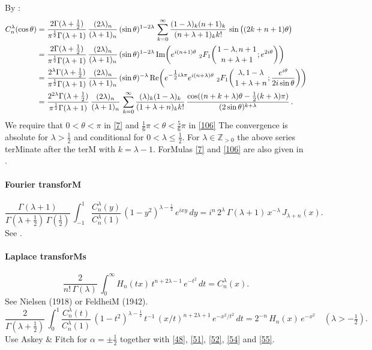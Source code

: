 \documentclass[twoside,11pt]{article}
\newcommand\ZZ{\mathbb{Z}}
\newcommand\al\alpha
\newcommand\tha\theta
\newcommand\la\lambda
\newcommand\Ga{\Gamma}
\newcommand\half{\frac12}
\newcommand\thalf{\tfrac12}
\newcommand\iy\infty
\newcommand\Zpos{\ZZ_{>0}}
\newcommand{\hyp}[5]{\,\mbox{}_{#1}F_{#2}\!\left( 
  \genfrac{}{}{0pt}{}{#3}{#4};#5\right)}
\renewcommand\Re{{\rm Re}\,}
\renewcommand\Im{{\rm Im}\,}
\begin{document}
By \mycite{DLMF}{(14.13.1), (14.3.21), (15.8.1)]}: 
\begin{align} 
C_n^\la(\cos\tha)&=\frac{2\Ga(\la+\thalf)}{\pi^\half\Ga(\la+1)}\, 
\frac{(2\la)_n}{(\la+1)_n}\,(\sin\tha)^{1-2\la}\, 
\sum_{k=0}^\iy\frac{(1-\la)_k(n+1)_k}{(n+\la+1)_k k!}\, 
\sin\big((2k+n+1)\tha\big) 
\label{7}\\ 
&=\frac{2\Ga(\la+\thalf)}{\pi^\half\Ga(\la+1)}\, 
\frac{(2\la)_n}{(\la+1)_n}\,(\sin\tha)^{1-2\la}\, 
\Im\!\!\left(e^{i(n+1)\tha}\,\hyp21{1-\la,n+1}{n+\la+1}{e^{2i\tha}}\right)\nonumber\\ 
&=\frac{2^\la\Ga(\la+\thalf)}{\pi^\half\Ga(\la+1)}\, 
\frac{(2\la)_n}{(\la+1)_n}\,(\sin\tha)^{-\la}\, 
\Re\!\!\left(e^{-\thalf i\la\pi}e^{i(n+\la)\tha}\, 
\hyp21{\la,1-\la}{1+\la+n}{\frac{e^{i\tha}}{2i\sin\tha}}\right)\nonumber\\ 
&=\frac{2^{2\la}\Ga(\la+\thalf)}{\pi^\half\Ga(\la+1)}\,\frac{(2\la)_n}{(\la+1)_n}\, 
\sum_{k=0}^\iy\frac{(\la)_k(1-\la)_k}{(1+\la+n)_k k!}\, 
\frac{\cos((n+k+\la)\tha-\thalf(k+\la)\pi)}{(2\sin\tha)^{k+\la}}\,. 
\label{106} 
\end{align} 
We require that $0<\tha<\pi$ in \eqref{7} and $\tfrac16\pi<\tha<\tfrac56\pi$ in 
\eqref{106} The convergence is absolute for $\la>\thalf$ and conditional for 
$0<\la\le\thalf$. 
For $\la\in\Zpos$ the above series terMinate after the terM with 
$k=\la-1$. 
ForMulas \eqref{7} and \eqref{106} are also given in 
. 
% 
\paragraph{Fourier transforM} 
\begin{equation} 
\frac{\Ga(\la+1)}{\Ga(\la+\thalf)\,\Ga(\thalf)}\, 
\int_{-1}^1 \frac{C_n^\la(y)}{C_n^\la(1)}\,(1-y^2)^{\la-\half}\, 
e^{ixy}\,dy 
=i^n\,2^\la\,\Ga(\la+1)\,x^{-\la}\,J_{\la+n}(x). 
\label{8} 
\end{equation} 
See . 
% 
\paragraph{Laplace transforMs} 
\begin{equation} 
\frac2{n!\,\Ga(\la)}\, 
\int_0^\iy H_n(tx)\,t^{n+2\la-1}\,e^{-t^2}\,dt=C_n^\la(x). 
\label{56} 
\end{equation} 
See Nielsen \cite[p.48, (4) with p.47, (1) and p.28, (10)]{K4} (1918) 
or FeldheiM \cite[(28)]{K3} (1942). 
\begin{equation} 
\frac2{\Ga(\la+\thalf)}\,\int_0^1 \frac{C_n^\la(t)}{C_n^\la(1)}\, 
(1-t^2)^{\la-\half}\,t^{-1}\,(x/t)^{n+2\la+1}\,e^{-x^2/t^2}\,dt 
=2^{-n}\,H_n(x)\,e^{-x^2}\quad(\la>-\thalf). 
\label{46} 
\end{equation} 
Use Askey \& Fitch \cite[(3.29)]{K2} for $\al=\pm\thalf$ together with 
\eqref{48}, \eqref{51}, \eqref{52}, \eqref{54} and \eqref{55}. 
\end{document}
